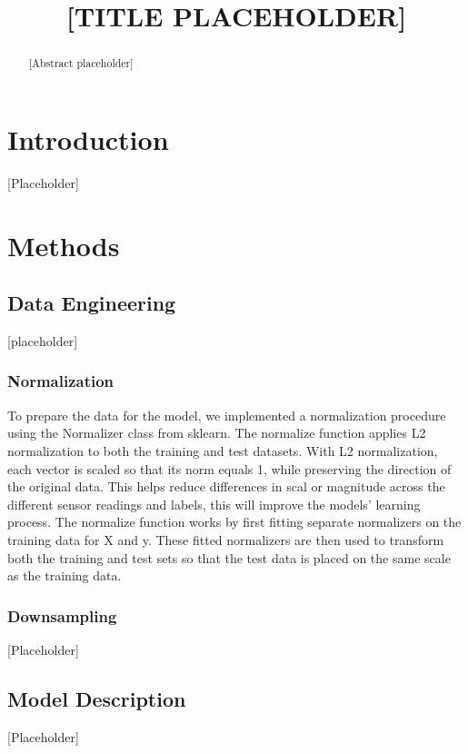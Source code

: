 \documentclass[conference]{IEEEtran}
\begin{document}
\title{[TITLE PLACEHOLDER]}

\author{
}

\maketitle

\begin{abstract}
[Abstract placeholder]
\end{abstract}

\section{Introduction}
[Placeholder]

\section{Methods}

\subsection{Data Engineering}
[placeholder]

\subsubsection{Normalization}
To prepare the data for the model, we implemented a normalization procedure using the Normalizer class from sklearn. The normalize function applies L2 normalization to both the training and test datasets. With L2 normalization, each vector is scaled so that its norm equals 1, while preserving the direction of the original data. This helps reduce differences in scal or magnitude across the different sensor readings and labels, this will improve the models' learning process. The normalize function works by first fitting separate normalizers on the training data for X and y. These fitted normalizers are then used to transform both the training and test sets so that the test data is placed on the same scale as the training data.

\subsubsection{Downsampling}
[Placeholder]

\subsection{Model Description}
[Placeholder]
\end{document}
